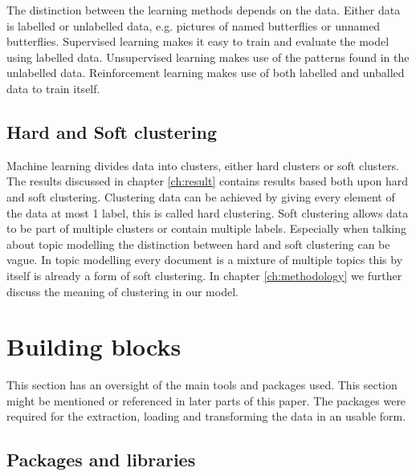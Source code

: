 The distinction between the learning methods depends on the data. Either data is labelled or unlabelled data, e.g. pictures of named butterflies or unnamed butterflies. Supervised learning makes it easy to train and evaluate the model using labelled data. Unsupervised learning makes use of the patterns found in the unlabelled data. Reinforcement learning makes use of both labelled and unballed data to train itself. 

\subsection{Hard and Soft clustering}
Machine learning divides data into clusters, either hard clusters or soft clusters. The results discussed in chapter \ref{ch:result} contains results based both upon hard and soft clustering. Clustering data can be achieved by giving every element of the data at most 1 label, this is called hard clustering. Soft clustering allows data to be part of multiple clusters or contain multiple labels. Especially when talking about topic modelling the distinction between hard and soft clustering can be vague. In topic modelling every document is a mixture of multiple topics this by itself is already a form of soft clustering. In chapter \ref{ch:methodology} we further discuss the meaning of clustering in our model.

\section{Building blocks} \label{theory:buildingblocks}
This section has an oversight of the main tools and packages used. This section might be mentioned or referenced in later parts of this paper. The packages were required for the extraction, loading and transforming the data in an usable form.

\subsection{Packages and libraries}

